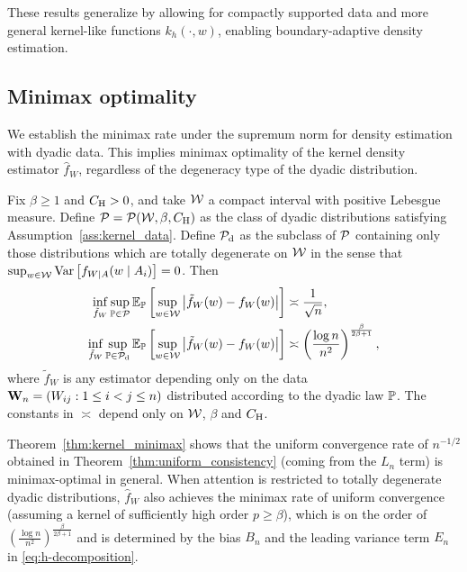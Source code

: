 These results generalize \citet*[Theorem~1]{chiang2020empirical}
by allowing for compactly supported data and more general kernel-like
functions $k_h(\cdot,w)$, enabling boundary-adaptive density estimation.

\subsection{Minimax optimality}

We establish the minimax rate under the supremum norm for density estimation
with dyadic data. This implies minimax optimality of the kernel density
estimator $\hat f_W$, regardless of the degeneracy type of the dyadic
distribution.

\begin{theorem}
  \label{thm:kernel_minimax}

  Fix $\beta \geq 1$ and $C_\rH > 0$,
  and take $\cW$ a compact interval with
  positive Lebesgue measure.
  Define $\cP = \cP(\cW, \beta, C_\rH)$
  as the class of dyadic distributions
  satisfying Assumption~\ref{ass:kernel_data}.
  Define $\cP_\rd$ as the subclass of $\cP$
  containing only those distributions
  which are totally degenerate on $\cW$ in the sense that
  $\sup_{w \in \cW} \Var\left[f_{W \mid A}(w \mid A_i)\right] = 0$.
  Then
  \begin{align*}
    \inf_{\tilde f_W}
    \sup_{\P \in \cP}
    \E_\P\left[
      \sup_{w \in \cW}
      \big|
      \tilde f_W(w) - f_W(w)
      \big|
    \right]
    &\asymp
    \frac{1}{\sqrt n}, \\
    \inf_{\tilde f_W}
    \sup_{\P \in \cP_\rd}
    \E_\P\left[
      \sup_{w \in \cW}
      \big|
      \tilde f_W(w) - f_W(w)
      \big|
    \right]
    &\asymp
    \left(
      \frac{\log n}{n^2}
    \right)^{\frac{\beta}{2\beta+1}},
  \end{align*}
  where $\tilde f_W$ is any estimator depending only on
  the data $\bW_n = (W_{i j}: 1 \leq i < j \leq n)$
  distributed according to the dyadic law $\P$.
  The constants in $\asymp$ depend only on
  $\cW$, $\beta$ and $C_\rH$.

\end{theorem}

Theorem~\ref{thm:kernel_minimax} shows that the uniform convergence rate of
$n^{-1/2}$
obtained in Theorem~\ref{thm:uniform_consistency}
(coming from the $L_n$ term) is minimax-optimal in general.
When attention is restricted to totally degenerate dyadic distributions,
$\hat f_W$ also achieves the minimax rate of uniform convergence
(assuming a kernel of sufficiently high order $p \geq \beta$),
which is on the order of
$\left(\frac{\log n}{n^2}\right)^{\frac{\beta}{2\beta+1}}$ and
is determined by the bias $B_n$ and the leading variance term $E_n$ in
\eqref{eq:h-decomposition}.

